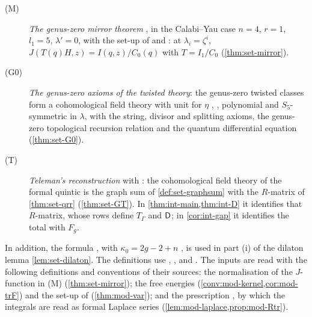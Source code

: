 \begin{description}
\item[(M)] \emph{The genus-zero mirror theorem} \cite[Theorem~11.6]{MR1408320}, in the Calabi--Yau case $n=4$, $r=1$, $l_1=5$, $\lambda'=0$, with the set-up of \cite[\S9]{MR1408320} and \cite[Prop.~11.4]{MR1408320}: at $\lambda_i=\zeta^i$, $J(T(q)H,z)=I(q,z)/C_0(q)$ with $T=I_1/C_0$ (\cref{thm:set-mirror}).
\item[(G0)] \emph{The genus-zero axioms of the twisted theory}: the genus-zero twisted classes form a cohomological field theory with unit for $\eta$ \cite[\S4.1]{GJR18}, \cite[Def.~0.3]{PPZ15}, polynomial and $S_5$-symmetric in $\lambda$, with the string, divisor and splitting axioms, the genus-zero topological recursion relation and the quantum differential equation \cite[\S5.2, (14)]{GJR18} (\cref{thm:set-G0}).
\item[(T)] \emph{Teleman's reconstruction} \cite[Theorem~(2) in (1.15)]{MR2917177} with \cite[\S4.1, Theorem~4.1]{GJR18}: the cohomological field theory of the formal quintic is the graph sum of \cref{def:set-graphsum} with the $R$-matrix of \cref{thm:set-qrr} (\cref{thm:set-GT}). In \cref{thm:int-main,thm:int-D} it identifies that $R$-matrix, whose rows define $T_\Gamma$ and $\mathsf{D}$; in \cref{cor:int-gap} it identifies the total with $F_g$.
\end{description}
In addition, the formula \cite[(1.7)]{AC96}, with $\kappa_0=2g-2+n$ \cite[p.~5]{AC96}, is used in part (i) of the dilaton lemma \cref{lem:set-dilaton}. The definitions use \cite[\S0.2, (5)]{LP18}, \cite[\S0.2, (5), (10)]{LP20}, \cite{ZZ08} and \cite{MR1666787}. The inputs are read with the following definitions and conventions of their sources: the normalisation of the $J$-function \cite[Section~6, (10)]{MR2276766} in (M) (\cref{thm:set-mirror}); the free energies \cite[Def.~4.3, (4-10)]{Eynard:2007kz} (\cref{conv:mod-kernel,cor:mod-trF}) and the set-up \cite[(5-1), (5-4), (5-13)]{Eynard:2007kz} of \cite[Theorem~5.1]{Eynard:2007kz} (\cref{thm:mod-var}); and the prescription \cite[\S3.1, \S3.5]{DuninBarkowski:2012bw}, by which the integrals \cite[(2-31), (2-32)]{Dunin-Barkowski:2015caa} are read as formal Laplace series (\cref{lem:mod-laplace,prop:mod-Rtr}).

